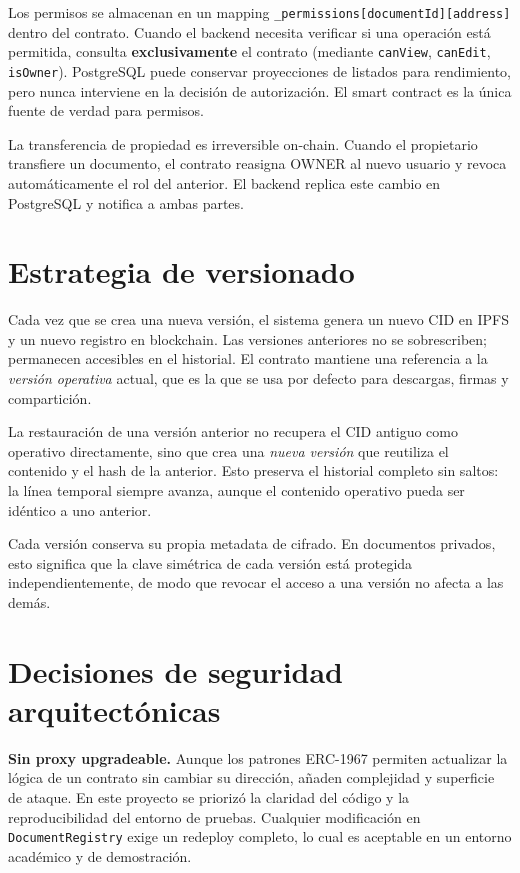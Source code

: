 \documentclass[11pt, a4paper]{article}
\begin{document}
Los permisos se almacenan en un mapping \texttt{\_permissions[documentId][address]} dentro del contrato. Cuando el backend necesita verificar si una operaci\'on est\'a permitida, consulta \textbf{exclusivamente} el contrato (mediante \texttt{canView}, \texttt{canEdit}, \texttt{isOwner}). PostgreSQL puede conservar proyecciones de listados para rendimiento, pero nunca interviene en la decisi\'on de autorizaci\'on. El smart contract es la \'unica fuente de verdad para permisos.

La transferencia de propiedad es irreversible on-chain. Cuando el propietario transfiere un documento, el contrato reasigna OWNER al nuevo usuario y revoca autom\'aticamente el rol del anterior. El backend replica este cambio en PostgreSQL y notifica a ambas partes.

\section{Estrategia de versionado}

Cada vez que se crea una nueva versi\'on, el sistema genera un nuevo CID en IPFS y un nuevo registro en blockchain. Las versiones anteriores no se sobrescriben; permanecen accesibles en el historial. El contrato mantiene una referencia a la \textit{versi\'on operativa} actual, que es la que se usa por defecto para descargas, firmas y compartici\'on.

La restauraci\'on de una versi\'on anterior no recupera el CID antiguo como operativo directamente, sino que crea una \textit{nueva versi\'on} que reutiliza el contenido y el hash de la anterior. Esto preserva el historial completo sin saltos: la l\'inea temporal siempre avanza, aunque el contenido operativo pueda ser id\'entico a uno anterior.

Cada versi\'on conserva su propia metadata de cifrado. En documentos privados, esto significa que la clave sim\'etrica de cada versi\'on est\'a protegida independientemente, de modo que revocar el acceso a una versi\'on no afecta a las dem\'as.

\section{Decisiones de seguridad arquitect\'onicas}

\textbf{Sin proxy upgradeable.} Aunque los patrones ERC-1967 permiten actualizar la l\'ogica de un contrato sin cambiar su direcci\'on, a\~naden complejidad y superficie de ataque. En este proyecto se prioriz\'o la claridad del c\'odigo y la reproducibilidad del entorno de pruebas. Cualquier modificaci\'on en \texttt{DocumentRegistry} exige un redeploy completo, lo cual es aceptable en un entorno acad\'emico y de demostraci\'on.
\end{document}
